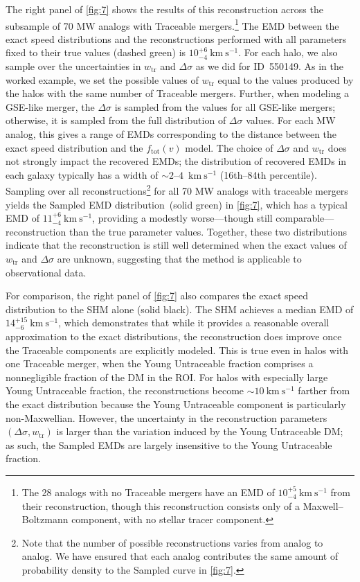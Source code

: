 \documentclass[twocolumn,tighten,twocolappendix]{aastex701}
\newcommand{\ftr}{\ensuremath{w_\mathrm{tr}}}
\newcommand{\kms}{\ensuremath{\text{km}~\text{s}^{-1}}}
\newcommand{\osim}{\mathord{\sim}}
\begin{document}
The right panel of \autoref{fig:7} shows the results of this reconstruction across the subsample of 70 MW analogs with Traceable mergers.\footnote{The 28 analogs with no Traceable mergers have an EMD of $10^{+5}_{-4}~\kms{}$ from their reconstruction, though this reconstruction consists only of a Maxwell--Boltzmann component, with no stellar tracer component.} The EMD between the exact speed distributions and the reconstructions performed with all parameters fixed to their true values (dashed green) is $10^{+6}_{-4}~\kms{}$. For each halo, we also sample over the uncertainties in \ftr{} and $\Delta\sigma$ as we did for ID~550149. As in the worked example, we set the possible values of \ftr{} equal to the values produced by the halos with the same number of Traceable mergers. Further, when modeling a GSE-like merger, the $\Delta\sigma$ is sampled from the values for all GSE-like mergers; otherwise, it is sampled from the full distribution of $\Delta\sigma$ values. For each MW analog, this gives a range of EMDs corresponding to the distance between the exact speed distribution and the $f_\mathrm{tot}(v)$ model. The choice of $\Delta\sigma$ and $\ftr$ does not strongly impact the recovered EMDs; the distribution of recovered EMDs in each galaxy typically has a width of $\osim2$--$4$~\kms{}  (16th--84th percentile). 
Sampling over all reconstructions\footnote{Note that the number of possible reconstructions varies from analog to analog. We have ensured that each analog contributes the same amount of probability density to the Sampled curve in \autoref{fig:7}.} for all 70 MW analogs with traceable mergers yields the Sampled EMD distribution~(solid green) in \autoref{fig:7}, which has a typical EMD of $11^{+6}_{-4}~\kms{}$, providing a modestly worse---though still comparable---reconstruction than the true parameter values. Together, these two distributions indicate that the reconstruction is still well determined when the exact values of \ftr{} and $\Delta\sigma$ are unknown, suggesting that the method is applicable to observational data. 

For comparison, the right panel of \autoref{fig:7} also compares the exact speed distribution to the SHM alone (solid black). The SHM achieves a median EMD of $14^{+15}_{-6}~\kms{}$, which demonstrates that while it provides a reasonable overall approximation to the exact distributions, the  reconstruction does improve once the Traceable components are explicitly modeled. This is true even in halos with one Traceable merger, when the Young Untraceable fraction comprises a nonnegligible fraction of the DM in the ROI. For halos with especially large Young Untraceable fraction, the reconstructions become $\osim 10~\kms{}$ farther from the exact distribution because the Young Untraceable component is particularly non-Maxwellian. However, the uncertainty in the reconstruction parameters $(\Delta\sigma, \ftr{})$ is larger than the variation induced by the Young Untraceable DM; as such, the Sampled EMDs are largely insensitive to the Young Untraceable fraction.
\end{document}
